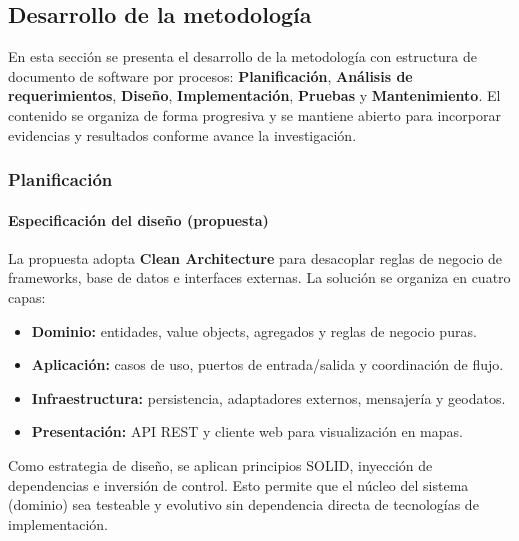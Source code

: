 \subsection{Desarrollo de la metodología}

En esta sección se presenta el desarrollo de la metodología con estructura de documento de software por procesos: \textbf{Planificación}, \textbf{Análisis de requerimientos}, \textbf{Diseño}, \textbf{Implementación}, \textbf{Pruebas} y \textbf{Mantenimiento}. El contenido se organiza de forma progresiva y se mantiene abierto para incorporar evidencias y resultados conforme avance la investigación.

\clearpage
\subsubsection{Planificación}

\paragraph{Especificación del diseño (propuesta)}

La propuesta adopta \textbf{Clean Architecture} para desacoplar reglas de negocio de frameworks, base de datos e interfaces externas. La solución se organiza en cuatro capas:
\begin{itemize}
    \item \textbf{Dominio:} entidades, value objects, agregados y reglas de negocio puras.
    \item \textbf{Aplicación:} casos de uso, puertos de entrada/salida y coordinación de flujo.
    \item \textbf{Infraestructura:} persistencia, adaptadores externos, mensajería y geodatos.
    \item \textbf{Presentación:} API REST y cliente web para visualización en mapas.
\end{itemize}

Como estrategia de diseño, se aplican principios SOLID, inyección de dependencias e inversión de control. Esto permite que el núcleo del sistema (dominio) sea testeable y evolutivo sin dependencia directa de tecnologías de implementación.

